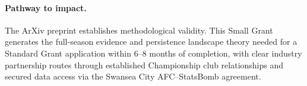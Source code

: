 \paragraph{Pathway to impact.}
The ArXiv preprint establishes methodological validity. This Small Grant generates the full-season evidence and persistence landscape theory needed for a Standard Grant application within 6--8 months of completion, with clear industry partnership routes through established Championship club relationships and secured data access via the Swansea City AFC--StatsBomb agreement.
